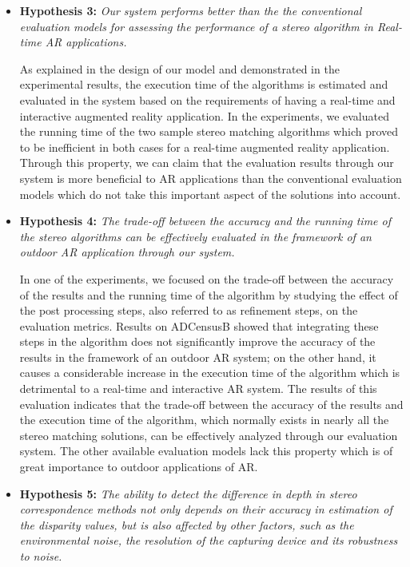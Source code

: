\begin{itemize}
\item \textbf{Hypothesis 3:} \emph{Our system performs better than the the conventional evaluation models for assessing the performance of a stereo algorithm in
Real-time AR applications.}

As explained in the design of our model and demonstrated in the experimental results, the execution time of the algorithms 
is estimated and evaluated in the system based on the requirements of having a real-time and interactive augmented reality application.
In the experiments, we evaluated the running time of the two sample stereo matching algorithms which proved to be inefficient in both cases for 
a real-time augmented reality application. Through this property, we can claim that the evaluation results through our system is more beneficial to AR applications
than the conventional evaluation models which do not take this important aspect of the solutions into account.

\item \textbf{Hypothesis 4:} \emph{The trade-off between the accuracy and the running time of the stereo algorithms can be effectively evaluated 
in the framework of an outdoor AR application through our system.} 

In one of the experiments, we focused on the trade-off between the accuracy of the results and the running time of the algorithm by studying the effect
of the post processing steps, also referred to as refinement steps, on the evaluation metrics. Results on ADCensusB showed that integrating these steps in the algorithm
does not significantly improve the accuracy of the results in the framework of an outdoor AR system; on the other hand, it causes a considerable increase in the execution
time of the algorithm which is detrimental to a real-time and interactive AR system. The results of this evaluation indicates that the trade-off between the accuracy 
of the results and the execution time of the algorithm, which normally exists in nearly all the stereo matching solutions, can be effectively analyzed 
through our evaluation system. The other available evaluation models lack this property which is of great importance to outdoor applications of AR.

\item \textbf{Hypothesis 5:} \emph{The ability to detect the difference in depth in stereo correspondence methods not only depends on their accuracy
in estimation of the disparity values, but is also affected by other factors, such as the environmental noise, the resolution of the capturing device and its
robustness to noise.}


\end{itemize}

